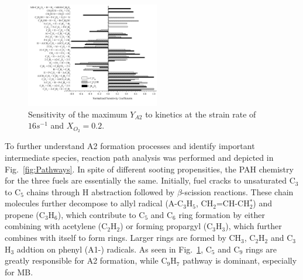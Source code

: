 \documentclass[preprint,3p,times,twocolumn]{elsarticleUS}
\begin{document}
\begin{figure}[ht]
  \centering
  \scriptsize
  \includegraphics[width=0.52\textwidth]{SA4.png}
  \normalsize
  \vspace{-0.2in}
  \caption{Sensitivity of the maximum $Y_{A2}$ to kinetics at the strain rate of $16 s^{-1}$ and $X_{O_2}=0.2$.}
  \label{fig:SA4}
\end{figure}

To further understand A2 formation processes and identify important intermediate species, reaction path analysis was performed and depicted in Fig.~\ref{fig:Pathways}. In spite of different sooting propensities, the PAH chemistry for the three fuels are essentially the same. Initially, fuel cracks to unsaturated C$_3$ to C$_5$ chains through H abstraction followed by $\beta$-scission reactions. These chain molecules further decompose to allyl radical (A-C$_3$H$_5$, CH$_2$=CH-CH$_2^*$) and propene (C$_3$H$_6$), which contribute to C$_5$ and C$_6$ ring formation by either combining with acetylene (C$_2$H$_2$) or forming propargyl (C$_3$H$_3$), which further combines with itself to form rings. Larger rings are formed by CH$_3$, C$_2$H$_2$ and C$_3$H$_3$ addtion on phenyl (A1-) radicals. As seen in Fig.~\ref{fig:SA4}, C$_5$ and C$_9$ rings are greatly responsible for A2 formation, while C$_9$H$_7$ pathway is dominant, especially for MB.
\end{document}
